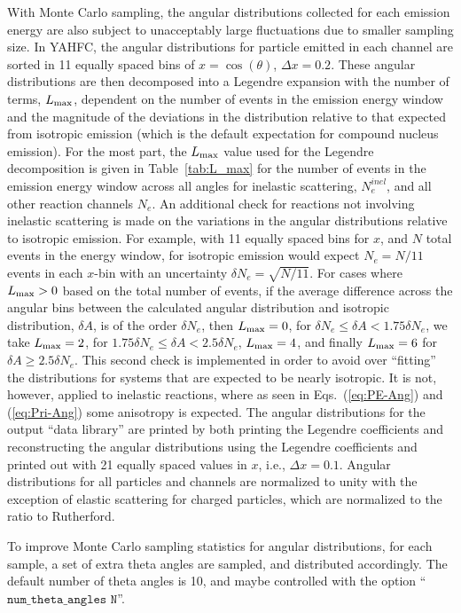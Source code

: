 \documentclass[
10pt,
showpacs,preprintnumbers,footinbib,
amsfonts,amsmath,amssymb,
aps,
prc,twocolumn,groupedaddress,superscriptaddress,
showkeys,
nofootinbib
]{revtex4-1}
\begin{document}
With Monte Carlo sampling, the angular distributions collected for each emission energy are also subject to unacceptably large fluctuations due to smaller sampling size. In YAHFC, the angular distributions for particle emitted in each channel are sorted in 11 equally spaced bins of $x=\cos(\theta)$, $\Delta x = 0.2$. These angular distributions are then decomposed into a Legendre expansion with the number of terms, $L_{\rm max}$, dependent on the number of events in the emission energy window and the magnitude of the deviations in the distribution relative to that expected from isotropic emission (which is the default expectation for compound nucleus emission). For the most part, the $L_{\rm max}$ value used for the Legendre decomposition is given in Table~\ref{tab:L_max} for the number of events in the emission energy window across all angles for inelastic scattering, $N_e^{inel}$, and all other reaction channels $N_e$. An additional check for reactions not involving inelastic scattering is made on the variations in the angular distributions relative to isotropic emission. For example, with 11 equally spaced bins for $x$, and $N$ total events in the energy window, for isotropic emission would expect $N_e=N/11$ events in each $x$-bin with an uncertainty $\delta N_e = \sqrt{N/11}$. For cases where $L_{\rm max} > 0$ based on the total number of events, if the average difference across the angular bins between the calculated angular distribution and isotropic distribution, $\delta A$, is of the order $\delta N_e$, then $L_{\rm max} = 0$, for $\delta N_e \le \delta A < 1.75 \delta N_e$, we take $L_{\rm max} = 2$, for $1.75\delta N_e \le \delta A < 2.5 \delta N_e$, $L_{\rm max} = 4$, and finally $L_{\rm max} = 6$ for $ \delta A \ge 2.5 \delta N_e$. This second check is implemented in order to avoid over ``fitting'' the distributions for systems that are expected to be nearly isotropic. It is not, however, applied to inelastic reactions, where as seen in Eqs.~(\ref{eq:PE-Ang}) and (\ref{eq:Pri-Ang}) some anisotropy is expected.  The angular distributions for the output ``data library'' are printed by both printing the Legendre coefficients and  reconstructing the angular distributions using the Legendre coefficients and printed out with 21 equally spaced values in $x$, i.e., $\Delta x = 0.1$. Angular distributions for all particles and channels are normalized to unity with the exception of elastic scattering for charged particles, which are normalized to the ratio to Rutherford. 

To improve Monte Carlo sampling statistics for angular distributions, for each sample, a set of extra theta angles are sampled, and distributed accordingly. The default number of theta angles is 10, and maybe controlled with the option ``${\texttt{num\_theta\_angles N}}$''.
\end{document}

